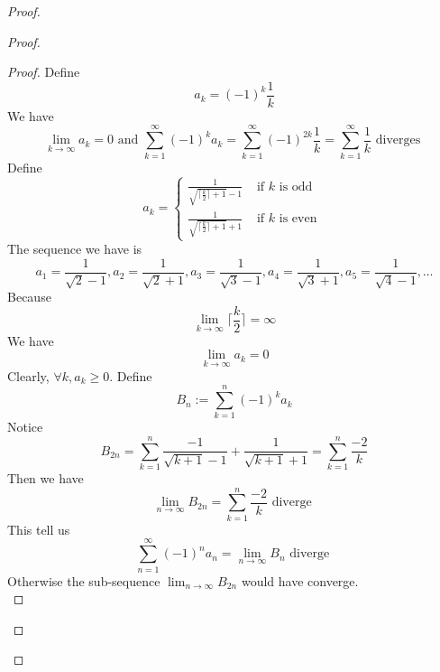 \documentclass{report}
\begin{document}
\begin{proof}
\begin{proof}
\begin{proof}
Define
\begin{equation}
a_k=(-1)^k \frac{1}{k}
\end{equation}
We have
\begin{equation}
\lim_{k\to\infty}a_k=0\text{ and }\sum_{k=1}^\infty (-1)^k a_k=\sum_{k=1}^\infty (-1)^{2k}\frac{1}{k}=\sum_{k=1}^\infty \frac{1}{k}\text{ diverges }
\end{equation}
Define
\begin{equation}
a_k=\begin{cases}
\frac{1}{\sqrt{\lceil \frac{k}{2} \rceil +1}-1}& \text{ if $k$ is odd }\\
\frac{1}{\sqrt{\lceil \frac{k}{2} \rceil +1}+1 }& \text{ if $k$ is even }
\end{cases}
\end{equation}
The sequence we have is
\begin{equation}
a_1=\frac{1}{\sqrt{2} -1},a_2=\frac{1}{\sqrt{2} +1},a_3=\frac{1}{\sqrt{3} -1},a_4=\frac{1}{\sqrt{3} +1},a_5=\frac{1}{\sqrt{4} -1},\dots
\end{equation}
Because 
\begin{equation}
\lim_{k\to\infty} \lceil \frac{k}{2}\rceil =\infty
\end{equation}
We have
\begin{equation}
\lim_{k\to\infty} a_k=0
\end{equation}
Clearly, $\forall k,a_k\geq 0$. Define
\begin{equation}
B_n:=\sum_{k=1}^n (-1)^k a_k
\end{equation}
Notice
\begin{equation}
B_{2n}=\sum_{k=1}^n \frac{-1}{\sqrt{k+1}-1}+\frac{1}{\sqrt{k+1} +1}=\sum_{k=1}^n \frac{-2}{k}
\end{equation}
Then we have
\begin{equation}
\lim_{n\to\infty}B_{2n}=\sum_{k=1}^n \frac{-2}{k}\text{ diverge }
\end{equation}
This tell us
\begin{equation}
\sum_{n=1}^\infty (-1)^n a_n=\lim_{n\to\infty}B_{n}\text{ diverge }
\end{equation}
Otherwise the sub-sequence $\lim_{n\to\infty}B_{2n}$ would have converge.\\


\end{proof}
\end{proof}
\end{proof}
\end{document}
